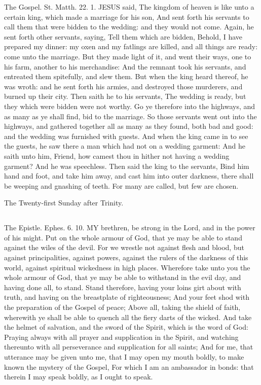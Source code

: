 The Gospel. St. Matth. 22. 1.
JESUS said, The kingdom of heaven is like unto a certain king, which made a marriage for his son, And sent forth his servants to call them that were bidden to the wedding: and they would not come. Again, he sent forth other servants, saying, Tell them which are bidden, Behold, I have prepared my dinner: my oxen and my fatlings are killed, and all things are ready: come unto the marriage. But they made light of it, and went their ways, one to his farm, another to his merchandise: And the remnant took his servants, and entreated them spitefully, and slew them. But when the king heard thereof, he was wroth: and he sent forth his armies, and destroyed those murderers, and burned up their city. Then saith he to his servants, The wedding is ready, but they which were bidden were not worthy. Go ye therefore into the highways, and as many as ye shall find, bid to the marriage. So those servants went out into the highways, and gathered together all as many as they found, both bad and good: and the wedding was furnished with guests. And when the king came in to see the guests, he saw there a man which had not on a wedding garment: And he saith unto him, Friend, how camest thou in hither not having a wedding garment? And he was speechless. Then said the king to the servants, Bind him hand and foot, and take him away, and cast him into outer darkness, there shall be weeping and gnashing of teeth. For many are called, but few are chosen.


The Twenty-first Sunday after Trinity.
\subsection{}


The Epistle. Ephes. 6. 10.
MY brethren, be strong in the Lord, and in the power of his might. Put on the whole armour of God, that ye may be able to stand against the wiles of the devil. For we wrestle not against flesh and blood, but against principalities, against powers, against the rulers of the darkness of this world, against spiritual wickedness in high places. Wherefore take unto you the whole armour of God, that ye may be able to withstand in the evil day, and having done all, to stand. Stand therefore, having your loins girt about with truth, and having on the breastplate of righteousness; And your feet shod with the preparation of the Gospel of peace; Above all, taking the shield of faith, wherewith ye shall be able to quench all the fiery darts of the wicked. And take the helmet of salvation, and the sword of the Spirit, which is the word of God: Praying always with all prayer and supplication in the Spirit, and watching thereunto with all perseverance and supplication for all saints; And for me, that utterance may be given unto me, that I may open my mouth boldly, to make known the mystery of the Gospel, For which I am an ambassador in bonds: that therein I may speak boldly, as I ought to speak.


